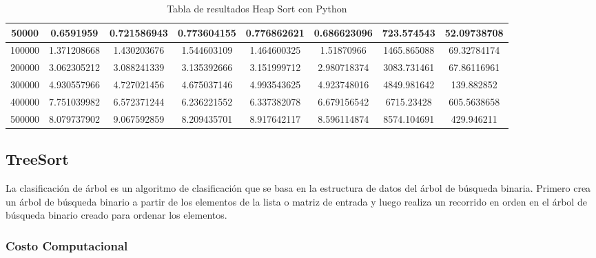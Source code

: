 \documentclass{article}
\begin{document}
\begin{table}[]
\begin{tabular}{|c|c|c|c|c|c|c|c| }
    50000	&0.6591959	    &0.721586943	&0.773604155	&0.776862621	&0.686623096	&723.574543	 	&52.09738708\\ \hline
    100000	&1.371208668	&1.430203676	&1.544603109	&1.464600325	&1.51870966	     &1465.865088	 	&69.32784174\\ \hline
    200000	&3.062305212	&3.088241339	&3.135392666	&3.151999712	&2.980718374	&3083.731461	 	&67.86116961\\ \hline
    300000	&4.930557966	&4.727021456	&4.675037146	&4.993543625	&4.923748016	&4849.981642	 	&139.882852\\ \hline
    400000	&7.751039982	&6.572371244	&6.236221552	&6.337382078	&6.679156542	&6715.23428	 	&605.5638658\\ \hline
    500000	&8.079737902	&9.067592859	&8.209435701	&8.917642117	&8.596114874	&8574.104691	 	&429.946211\\ \hline
        \end{tabular}
           \caption{Tabla de resultados Heap Sort con Python}
        \label{tab:heapSortC}
    \end{table}

    \subsection{TreeSort}
    La clasificación de árbol es un algoritmo de clasificación que se basa en la estructura de datos del árbol de búsqueda binaria. Primero crea un árbol de búsqueda binario a partir de los elementos de la lista o matriz de entrada y luego realiza un recorrido en orden en el árbol de búsqueda binario creado para ordenar los elementos.
        \subsubsection{Costo Computacional}
\end{document}
